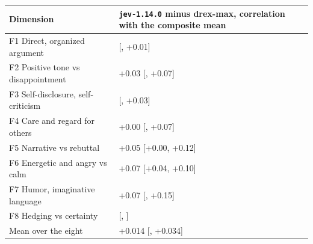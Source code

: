 {\small
\begin{tabular}{@{}l l@{}}
\toprule
Dimension & \texttt{jev-1.14.0} minus drex-max, correlation with the composite mean \\
\midrule
F1 Direct, organized argument & \textminus 0.03 {\scriptsize[\textminus 0.08, +0.01]} \\
F2 Positive tone vs disappointment & +0.03 {\scriptsize[\textminus 0.00, +0.07]} \\
F3 Self-disclosure, self-criticism & \textminus 0.01 {\scriptsize[\textminus 0.05, +0.03]} \\
F4 Care and regard for others & +0.00 {\scriptsize[\textminus 0.08, +0.07]} \\
F5 Narrative vs rebuttal & +0.05 {\scriptsize[+0.00, +0.12]} \\
F6 Energetic and angry vs calm & +0.07 {\scriptsize[+0.04, +0.10]} \\
F7 Humor, imaginative language & +0.07 {\scriptsize[\textminus 0.01, +0.15]} \\
F8 Hedging vs certainty & \textminus 0.07 {\scriptsize[\textminus 0.13, \textminus 0.02]} \\
\midrule
Mean over the eight & +0.014 {\scriptsize[\textminus 0.008, +0.034]} \\
\bottomrule
\end{tabular}}
